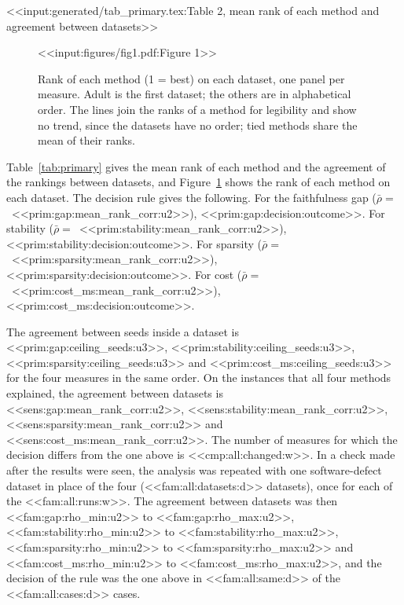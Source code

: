 \documentclass[10pt,a4paper,twocolumn]{article}
\begin{document}
<<input:generated/tab_primary.tex:Table 2, mean rank of each method and agreement between datasets>>

\begin{figure}[t]
\centering
<<input:figures/fig1.pdf:Figure 1>>
\caption{Rank of each method (1 = best) on each dataset, one panel per measure. Adult is
the first dataset; the others are in alphabetical order. The lines join the ranks of a
method for legibility and show no trend, since the datasets have no order; tied methods
share the mean of their ranks.}
\label{fig:ranks}
\end{figure}

Table~\ref{tab:primary} gives the mean rank of each method and the agreement of the
rankings between datasets, and Figure~\ref{fig:ranks} shows the rank of each method on
each dataset. The decision rule gives the following. For the faithfulness gap
($\bar{\rho}=$~<<prim:gap:mean_rank_corr:u2>>), <<prim:gap:decision:outcome>>. For
stability ($\bar{\rho}=$~<<prim:stability:mean_rank_corr:u2>>),
<<prim:stability:decision:outcome>>. For sparsity
($\bar{\rho}=$~<<prim:sparsity:mean_rank_corr:u2>>), <<prim:sparsity:decision:outcome>>.
For cost ($\bar{\rho}=$~<<prim:cost_ms:mean_rank_corr:u2>>),
<<prim:cost_ms:decision:outcome>>.

The agreement between seeds inside a dataset is <<prim:gap:ceiling_seeds:u3>>,
<<prim:stability:ceiling_seeds:u3>>, <<prim:sparsity:ceiling_seeds:u3>> and
<<prim:cost_ms:ceiling_seeds:u3>> for the four measures in the same order. On the
instances that all four methods explained, the agreement between datasets is
<<sens:gap:mean_rank_corr:u2>>, <<sens:stability:mean_rank_corr:u2>>,
<<sens:sparsity:mean_rank_corr:u2>> and <<sens:cost_ms:mean_rank_corr:u2>>.
The number of measures for which the decision differs from the one above is
<<cmp:all:changed:w>>. In a check made after the results were seen, the analysis was
repeated with one software-defect dataset in place of the four (<<fam:all:datasets:d>>
datasets), once for each of the <<fam:all:runs:w>>. The agreement between datasets was
then <<fam:gap:rho_min:u2>> to <<fam:gap:rho_max:u2>>, <<fam:stability:rho_min:u2>> to
<<fam:stability:rho_max:u2>>, <<fam:sparsity:rho_min:u2>> to <<fam:sparsity:rho_max:u2>>
and <<fam:cost_ms:rho_min:u2>> to <<fam:cost_ms:rho_max:u2>>, and the decision of the
rule was the one above in <<fam:all:same:d>> of the <<fam:all:cases:d>> cases.
\end{document}
